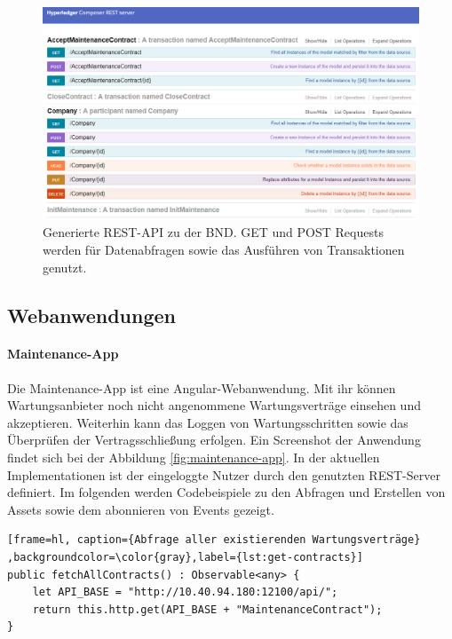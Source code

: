 \begin{figure}[!htbp]
    \centering
      \includegraphics[width=1.0\textwidth,angle=0]{images/rest-api}
       \caption{Generierte REST-API zu der BND. GET und POST Requests werden für Datenabfragen sowie das Ausführen von Transaktionen genutzt.}
      \label{fig:rest-api}
\end{figure}

\subsection{Webanwendungen}

\paragraph{Maintenance-App}
Die Maintenance-App ist eine Angular-Webanwendung. Mit ihr können Wartungsanbieter noch nicht angenommene Wartungsverträge einsehen und akzeptieren. Weiterhin kann das Loggen von Wartungsschritten sowie das Überprüfen der Vertragsschließung erfolgen. Ein Screenshot der Anwendung findet sich bei der Abbildung \ref{fig:maintenance-app}. In der aktuellen Implementationen ist der eingeloggte Nutzer durch den genutzten REST-Server definiert. Im folgenden werden Codebeispiele zu den Abfragen und Erstellen von Assets sowie dem abonnieren von Events gezeigt.

\begin{lstfloat}
\begin{lstlisting}[frame=hl, caption={Abfrage aller existierenden Wartungsverträge} ,backgroundcolor=\color{gray},label={lst:get-contracts}]
public fetchAllContracts() : Observable<any> {
    let API_BASE = "http://10.40.94.180:12100/api/";
    return this.http.get(API_BASE + "MaintenanceContract");
}
\end{lstlisting} 
\end{lstfloat}


